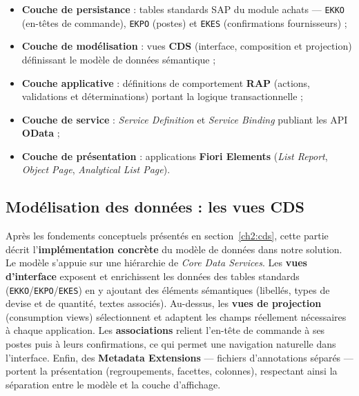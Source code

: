 \documentclass[12pt,a4paper,oneside]{report}
\begin{document}
\begin{itemize}[label=\textbullet, itemsep=0.25em]
    \item \textbf{Couche de persistance} : tables standards SAP du module achats ---
          \texttt{EKKO} (en-têtes de commande), \texttt{EKPO} (postes) et \texttt{EKES}
          (confirmations fournisseurs) ;
    \item \textbf{Couche de modélisation} : vues \textbf{CDS} (interface, composition et
          projection) définissant le modèle de données sémantique ;
    \item \textbf{Couche applicative} : définitions de comportement \textbf{RAP}
          (actions, validations et déterminations) portant la logique transactionnelle ;
    \item \textbf{Couche de service} : \textit{Service Definition} et \textit{Service
          Binding} publiant les API \textbf{OData} ;
    \item \textbf{Couche de présentation} : applications \textbf{Fiori Elements}
          (\textit{List Report}, \textit{Object Page}, \textit{Analytical List Page}).
\end{itemize}

\subsection{Modélisation des données : les vues CDS}\label{ch5:cds}
Après les fondements conceptuels présentés en section~\ref{ch2:cds}, cette partie décrit
l'\textbf{implémentation concrète} du modèle de données dans notre solution. Le modèle
s'appuie sur une hiérarchie de \textit{Core Data Services}. Les
\textbf{vues d'interface} exposent et enrichissent les données des tables standards
(\texttt{EKKO}/\texttt{EKPO}/\texttt{EKES}) en y ajoutant des éléments sémantiques
(libellés, types de devise et de quantité, textes associés). Au-dessus, les
\textbf{vues de projection} (consumption views) sélectionnent et adaptent les champs
réellement nécessaires à chaque application. Les \textbf{associations} relient
l'en-tête de commande à ses postes puis à leurs confirmations, ce qui permet une
navigation naturelle dans l'interface. Enfin, des \textbf{Metadata Extensions} ---
fichiers d'annotations séparés --- portent la présentation (regroupements, facettes,
colonnes), respectant ainsi la séparation entre le modèle et la couche d'affichage.
\end{document}
